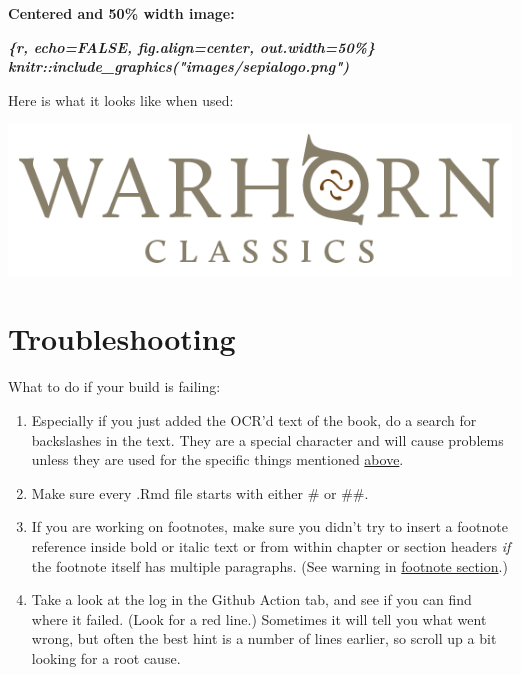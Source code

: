 \documentclass[
]{book}
\newenvironment{Shaded}{\begin{snugshade}}{\end{snugshade}}
\newcommand{\InformationTok}[1]{\textcolor[rgb]{0.56,0.35,0.01}{\textbf{\textit{#1}}}}
\providecommand{\tightlist}{%
  \setlength{\itemsep}{0pt}\setlength{\parskip}{0pt}}
\begin{document}
\textbf{Centered and 50\% width image:}

\begin{Shaded}
\begin{Highlighting}[]
\InformationTok{\textasciigrave{}\textasciigrave{}\textasciigrave{}\{r, echo=FALSE, fig.align=\textquotesingle{}center\textquotesingle{}, out.width=\textquotesingle{}50\%\textquotesingle{}\}}
\InformationTok{knitr::include\_graphics("images/sepialogo.png")}
\InformationTok{\textasciigrave{}\textasciigrave{}\textasciigrave{}}
\end{Highlighting}
\end{Shaded}

Here is what it looks like when used:

\begin{center}\includegraphics[width=0.5\linewidth]{images/sepialogo} \end{center}

\hypertarget{troubleshooting}{%
\chapter{Troubleshooting}\label{troubleshooting}}

What to do if your build is failing:

\begin{enumerate}
\def\labelenumi{\arabic{enumi}.}
\tightlist
\item
  Especially if you just added the OCR'd text of the book, do a search for backslashes in the text. They are a special character and will cause problems unless they are used for the specific things mentioned \protect\hyperlink{backslashes}{above}.
\item
  Make sure every .Rmd file starts with either \# or \#\#.
\item
  If you are working on footnotes, make sure you didn't try to insert a footnote reference inside bold or italic text or from within chapter or section headers \emph{if} the footnote itself has multiple paragraphs. (See warning in \protect\hyperlink{footnotes}{footnote section}.)
\item
  Take a look at the log in the Github Action tab, and see if you can find where it failed. (Look for a red line.) Sometimes it will tell you what went wrong, but often the best hint is a number of lines earlier, so scroll up a bit looking for a root cause.
\end{enumerate}
\end{document}
